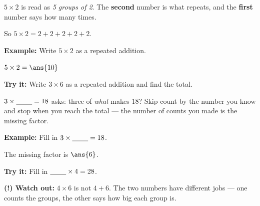 \documentclass[12pt]{article}
\begin{document}

\begin{formulabox}
$5 \times 2$ is read as \emph{5 groups of 2}. The \textbf{second} number is
what repeats, and the \textbf{first} number says how many times.\par
So $5 \times 2 = 2 + 2 + 2 + 2 + 2$.
\end{formulabox}

\begin{examplebox}
\textbf{Example:} \quad Write $5 \times 2$ as a repeated addition.

$5 \times 2 = \ans{10}$
\end{examplebox}

\begin{tryitbox}
\textbf{Try it:} \quad Write $3 \times 6$ as a repeated addition and find the
total.\\[2pt]
\end{tryitbox}


\begin{formulabox}
$3 \times \underline{\hspace{0.8cm}} = 18$ asks: three of \emph{what} makes
$18$? Skip-count by the number you know and stop when you reach the total ---
the number of counts you made is the missing factor.
\end{formulabox}

\begin{examplebox}
\textbf{Example:} \quad Fill in $3 \times \underline{\hspace{0.8cm}} = 18$.

The missing factor is $\ans{6}$.
\end{examplebox}

\begin{tryitbox}
\textbf{Try it:} \quad Fill in $\underline{\hspace{0.8cm}} \times 4 = 28$.\\[2pt]
\end{tryitbox}

\begin{watchoutbox}
\textbf{(!) Watch out:} $4 \times 6$ is not $4 + 6$. The two numbers have
different jobs --- one counts the groups, the other says how big each group is.
\end{watchoutbox}
\end{document}
